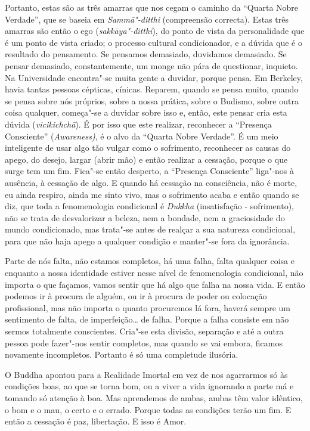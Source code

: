 Portanto, estas são as três amarras que nos cegam o caminho da ``Quarta
Nobre Verdade'', que se baseia em \emph{Sammā"-ditthi} (compreensão
correcta). Estas três amarras são então o ego (\emph{sakkāya"-ditthi}),
do ponto de vista da personalidade que é um ponto de vista criado; o
processo cultural condicionador, e a dúvida que é o resultado do
pensamento. Se pensamos demasiado, duvidamos demasiado. Se pensar
demasiado, constantemente, um monge não pára de questionar, inquieto. Na
Universidade encontra"-se muita gente a duvidar, porque pensa. Em
Berkeley, havia tantas pessoas cépticas, cínicas. Reparem, quando se
pensa muito, quando se pensa sobre nós próprios, sobre a nossa prática,
sobre o Budismo, sobre outra coisa qualquer, começa"-se a duvidar sobre
isso e, então, este pensar cria esta dúvida (\emph{vicikichchā}). É por
isso que este realizar, reconhecer a ``Presença Consciente''
(\emph{Awareness)}, é o alvo da ``Quarta Nobre Verdade''. É um meio
inteligente de usar algo tão vulgar como o sofrimento, reconhecer as
causas do apego, do desejo, largar (abrir mão) e então realizar a
cessação, porque o que surge tem um fim. Fica"-se então desperto, a
``Presença Consciente'' liga"-nos à ausência, à cessação de algo. E
quando há cessação na consciência, não é morte, eu ainda respiro, ainda
me sinto vivo, mas o sofrimento acaba e então quando se diz, que toda a
fenomenologia condicional é \emph{Dukkha} (insatisfação - sofrimento),
não se trata de desvalorizar a beleza, nem a bondade, nem a graciosidade
do mundo condicionado, mas trata"-se antes de realçar a sua natureza
condicional, para que não haja apego a qualquer condição e manter"-se
fora da ignorância.

Parte de nós falta, não estamos completos, há uma falha, falta qualquer
coisa e enquanto a nossa identidade estiver nesse nível de fenomenologia
condicional, não importa o que façamos, vamos sentir que há algo que
falha na nossa vida. E então podemos ir à procura de alguém, ou ir à
procura de poder ou colocação profissional, mas não importa o quanto
procuremos lá fora, haverá sempre um sentimento de falta, de
imperfeição\ldots{} de falha. Porque a falha consiste em não sermos
totalmente conscientes. Cria"-se esta divisão, separação e até a outra
pessoa pode fazer"-nos sentir completos, mas quando se vai embora,
ficamos novamente incompletos. Portanto é só uma completude ilusória.

O Buddha apontou para a Realidade Imortal em vez de nos agarrarmos só às
condições boas, ao que se torna bom, ou a viver a vida ignorando a parte
má e tomando só atenção à boa. Mas aprendemos de ambas, ambas têm valor
idêntico, o bom e o mau, o certo e o errado. Porque todas as condições
terão um fim. E então a cessação é paz, libertação. E isso é Amor.

